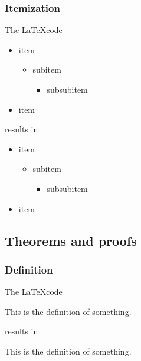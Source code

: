 \documentclass[report,english]{enacom}
\begin{document}
\subsubsection{Itemization}
	The \LaTeX code
	\begin{lcode}
	\begin{itemize}
		\item item
		\begin{itemize}
			\item subitem
			\begin{itemize}
				\item subsubitem
			\end{itemize}
		\end{itemize}
		\item item
	\end{itemize}
	\end{lcode}
	results in
	\begin{itemize}
		\item item
		\begin{itemize}
			\item subitem
			\begin{itemize}
				\item subsubitem
			\end{itemize}
		\end{itemize}
		\item item
	\end{itemize}


\subsection{Theorems and proofs}

\subsubsection{Definition}
	The \LaTeX code
	\begin{lcode}
	\begin{definition}[something]
    	This is the definition of something.
	\end{definition}
	\end{lcode}
    results  in		
    \begin{definition}[something]
    	This is the definition of something.
	\end{definition}
\end{document}

